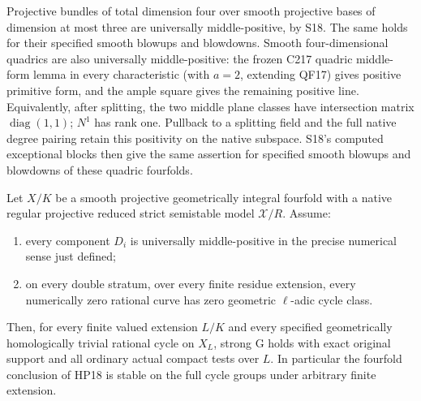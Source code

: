 Projective bundles of total dimension four over smooth projective
bases of dimension at most three are universally middle-positive,
by S18.  The same holds for their specified smooth blowups and
blowdowns.  Smooth four-dimensional quadrics are also universally
middle-positive: the frozen C217 quadric middle-form lemma in every characteristic
(with $a=2$, extending QF17) gives positive primitive form, and the ample square gives the
remaining positive line.  Equivalently, after splitting, the two
middle plane classes have intersection matrix $\operatorname{diag}(1,1)$;
$N^1$ has rank one.  Pullback to a splitting field and the full native
degree pairing retain this positivity on the native subspace.
S18's computed exceptional blocks then give the same assertion for
specified smooth blowups and blowdowns of these quadric fourfolds.

\begin{theorem}
\label{r18rb:fourfold}
Let $X/K$ be a smooth projective geometrically integral fourfold
with a native regular projective reduced strict semistable model
$\mathcal X/R$.  Assume:
\begin{enumerate}
\item every component $D_i$ is universally middle-positive in the
precise numerical sense just defined;
\item on every double stratum, over every finite residue extension,
every numerically zero rational curve has zero geometric
$\ell$-adic cycle class.
\end{enumerate}
Then, for every finite valued extension $L/K$ and every specified
geometrically homologically trivial rational cycle on $X_L$, strong
G holds with exact original support and all ordinary actual compact
tests over $L$.  In particular the fourfold conclusion of HP18 is
stable on the full cycle groups under arbitrary finite extension.
\end{theorem}

